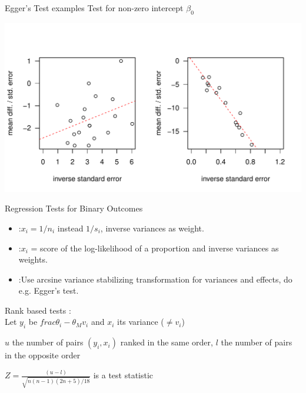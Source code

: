 \documentclass[english]{beamer}\usepackage[]{graphicx}\usepackage[]{color}
\makeatletter
\def\maxwidth{ %
  \ifdim\Gin@nat@width>\linewidth
    \linewidth
  \else
    \Gin@nat@width
  \fi
}
\newenvironment{knitrout}{}{} %
\makeatother
\begin{document}
\begin{frame}[fragile]{Egger's Test examples}
Test for non-zero intercept $\beta_{0}$

\vspace{-1.1cm}
\begin{knitrout}
\color{fgcolor}
\includegraphics[width=\maxwidth]{figure/unnamed-chunk-4-1} 

\end{knitrout}
\end{frame}


\begin{frame}{Regression Tests for Binary Outcomes}

\begin{itemize}
\item \citet{Peters} :$x_i = 1/n_i$ instead $1/s_i$, inverse variances as weight.
\item \citet{Harbord} :$x_i$ = score of the log-likelihood of a proportion and inverse variances as weights.
\item \citet{Rucker} :Use arcsine variance stabilizing transformation for variances and effects, do e.g. Egger's test.
\end{itemize}
\end{frame}


\begin{frame}{Rank based tests}
\citet{begg.ties}: \\
Let $y_{i}$ be $frac{\theta_i - \theta_M}{v_i}$ and $x_i$ its variance ($\neq v_i$)

$u$ the number of pairs $(y_{i}, x_{i})$ ranked in the same order, $l$
the number of pairs in the opposite order

$Z = \frac{(u - l)}{\sqrt{n(n-1)(2n + 5)/18}}$  is a test statistic
\end{frame}
\end{document}
